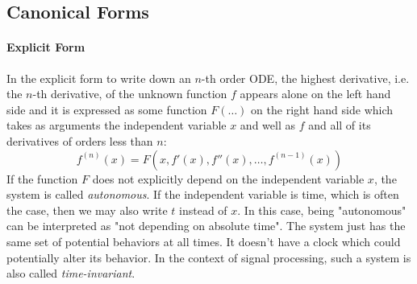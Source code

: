 



\subsection{Canonical Forms}


\paragraph{Explicit Form}
In the explicit form to write down an $n$-th order ODE, the highest derivative, i.e. the $n$-th derivative, of the unknown function $f$ appears alone on the left hand side and it is expressed as some function $F(\ldots)$ on the right hand side which takes as arguments the independent variable $x$ and well as $f$ and all of its derivatives of orders less than $n$:
\begin{equation}
f^{(n)}(x) = F(x, f'(x), f''(x), \ldots, f^{(n-1)}(x))
\end{equation}
If the function $F$ does not explicitly depend on the independent variable $x$, the system is called \emph{autonomous}. If the independent variable is time, which is often the case, then we may also write $t$ instead of $x$. In this case, being "autonomous" can be interpreted as "not depending on absolute time". The system just has the same set of potential behaviors at all times. It doesn't have a clock which could potentially alter its behavior. In the context of signal processing, such a system is also called \emph{time-invariant}.

